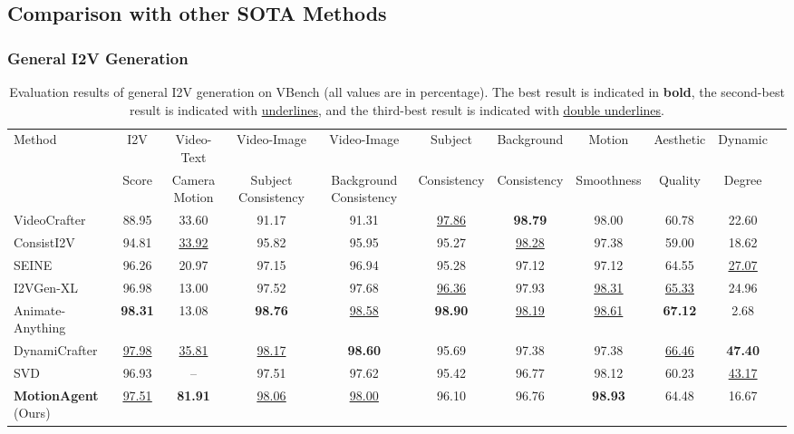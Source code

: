 \subsection{Comparison with other SOTA Methods}
\subsubsection{General I2V Generation}
\label{subsubsec: general}
\begin{table*}[ht]
  \centering
  \resizebox{1.0\linewidth}{!}
  {
  \begin{tabular}{lcccccccccc}
    \toprule
    \multirow{2}{*}{Method} & I2V & Video-Text & Video-Image & Video-Image & Subject & Background & Motion & Aesthetic & Dynamic\\
     & Score & Camera Motion & Subject Consistency & Background Consistency & Consistency & Consistency & Smoothness & Quality & Degree\\
    \midrule
    VideoCrafter \cite{chen2023videocrafter1} & 88.95 & 33.60 & 91.17 & 91.31 & \underline{97.86} & \textbf{98.79} & 98.00 & 60.78 & 22.60 \\
    ConsistI2V \cite{ren2024consisti2v} & 94.81 & \underline{\underline{33.92}} & 95.82 & 95.95 & 95.27 & \underline{98.28} & 97.38 & 59.00 & 18.62 \\
    SEINE \cite{chen2023seine} & 96.26 & 20.97 & 97.15 & 96.94 & 95.28 & 97.12 & 97.12 & 64.55 & \underline{\underline{27.07}} \\
    I2VGen-XL \cite{zhang2023i2vgen} & 96.98 & 13.00 & 97.52 & 97.68 & \underline{\underline{96.36}} & 97.93 & \underline{\underline{98.31}} & \underline{\underline{65.33}} & 24.96 \\
    Animate-Anything \cite{dai2023animateanything} & \textbf{98.31} & 13.08 & \textbf{98.76} & \underline{98.58} & \textbf{98.90} & \underline{\underline{98.19}} & \underline{98.61} & \textbf{67.12} & 2.68 \\
    DynamiCrafter \cite{xing2025dynamicrafter} & \underline{97.98} & \underline{35.81} & \underline{98.17} & \textbf{98.60} & 95.69 & 97.38 & 97.38 & \underline{66.46} & \textbf{47.40} \\
    SVD \cite{blattmann2023stable} & 96.93 & -- & 97.51 & 97.62 & 95.42 & 96.77 & 98.12 & 60.23 & \underline{43.17} \\
    \textbf{MotionAgent} (Ours) & \underline{\underline{97.51}} & \textbf{81.91} & \underline{\underline{98.06}} & \underline{\underline{98.00}} & 96.10 & 96.76 & \textbf{98.93} & 64.48 & 16.67 \\
    \bottomrule
    \end{tabular}
    }
    \caption{Evaluation results of general I2V generation on VBench \cite{huang2024vbench} (all values are in percentage). The best result is indicated in \textbf{bold}, the second-best result is indicated with \underline{underlines}, and the third-best result is indicated with \underline{\underline{double underlines}}.}
    \label{tab:vbench}
\end{table*}

